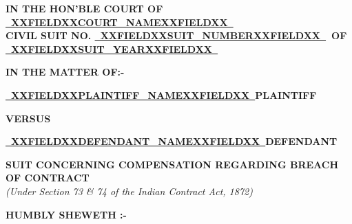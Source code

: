 \documentclass[12pt,a4paper]{article}
\newcommand{\fillline}[1]{\underline{~#1~}}
\begin{document}
\begin{center}
  {\bfseries IN THE HON'BLE COURT OF \fillline{XXFIELDXXCOURT_NAMEXXFIELDXX}}\\[4pt]
  {\bfseries CIVIL SUIT NO. \fillline{XXFIELDXXSUIT_NUMBERXXFIELDXX}\ OF \fillline{XXFIELDXXSUIT_YEARXXFIELDXX}}
\end{center}

\vspace{14pt}

\textbf{IN THE MATTER OF:-}

\vspace{8pt}

\textbf{\fillline{XXFIELDXXPLAINTIFF_NAMEXXFIELDXX}}\hfill\textbf{PLAINTIFF}

\vspace{12pt}
\textbf{VERSUS}
\vspace{12pt}

\textbf{\fillline{XXFIELDXXDEFENDANT_NAMEXXFIELDXX}}\hfill\textbf{DEFENDANT}

\vspace{12pt}

\begin{center}
  \textbf{SUIT CONCERNING COMPENSATION REGARDING BREACH OF CONTRACT}\\
  \textit{(Under Section 73 \& 74 of the Indian Contract Act, 1872)}
\end{center}

\vspace{14pt}

\textbf{\large HUMBLY SHEWETH :-}
\end{document}

